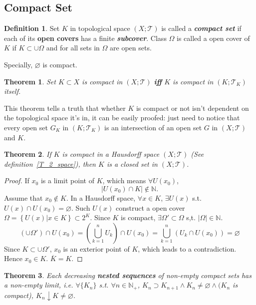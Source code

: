 \documentclass[openany]{book}
\newcommand*{\indexbf}[1]{\emph{\textbf{#1}}\index{#1}} %
\theoremstyle{plain}
\newtheorem{theorem}{Theorem}[section] %
\theoremstyle{definition}
\newtheorem{definition}{Definition}[section] %
\newcommand{\emphbf}[1]{\emph{\textbf{#1}}}
\begin{document}
\subsection{Compact Set}
\begin{definition}\label{compact}
Set $K$ in topological space $(X;\mathscr{T})$ is called a \indexbf{compact set} if each of its \textbf{open covers} has a finite \indexbf{subcover}. Class $\Omega$ is called a open cover of $K$ if $K\subset \cup{\Omega}$ and for all sets in $\Omega$ are open sets.
\end{definition}
Specially, $\varnothing$ is compact.
\begin{theorem}\label{selfcompact}
	Set $K\subset X$ is compact in $(X;\mathscr{T})$ \emphbf{iff} $K$ is compact in $(K;\mathscr{T}_K)$ itself. 
\end{theorem}
This theorem tells a truth that whether $K$ is compact or not isn't dependent on the topological space it's in, it can be easily proofed: just need to notice that every open set $G_K$ in $(K;\mathscr{T}_K)$ is an intersection of an open set $G$ in $(X;\mathscr{T})$ and $K$. 
\begin{theorem}\label{compact_Hausdorff_closed}
	If $K$ is compact in a Hausdorff space $(X;\mathscr{T})$ (See definition~\ref{T_2_space}), then $K$ is a closed set in $(X;\mathscr{T})$.
\end{theorem}
\begin{proof}
	If $x_0$ is a limit point of $K$, which means $\forall U(x_0)$, 
\[
	\left|U(x_0)\cap K\right|\notin \mathbb{N}.
\]
Assume that $x_0\notin K$. In a Hausdorff space, $\forall x\in K$, $\exists U(x)$ s.t. $U(x)\cap U(x_0)=\varnothing$. Such $U(x)$ construct a open cover $\Omega=\left\{U(x)|x\in K\right\}\subset 2^K$. Since $K$ is compact, $\exists \Omega'\subset\Omega$ s,t. $\left|\Omega\right|\in\mathbb{N}$. 
\[
	\left(\cup\Omega'\right)
	\cap U(x_0)
	=
	\left(\bigcup_{k=1}^n{U_k}\right)
	\cap U(x_0)
	=
	\bigcup_{k=1}^n\left(
		U_k\cap U(x_0)
	\right)
	=
	\varnothing
\]
Since $K\subset \cup\Omega'$, $x_0$ is an exterior point of $K$, which leads to a contradiction. Hence $x_0\in K$. $\overline{K}=K$.
\end{proof}
\begin{theorem}\label{nested_compact}
Each decreasing \emph{\textbf{nested sequences}} of non-empty compact sets has a non-empty limit, i.e. $\forall\{K_n\}$ s.t. $\forall n\in\mathbb{N}_+$, $K_n\supset K_{n+1}\wedge K_n\neq\varnothing\wedge (K_n$ is compact), $K_n\downarrow K\neq \varnothing$.
\end{theorem}
\end{document}
